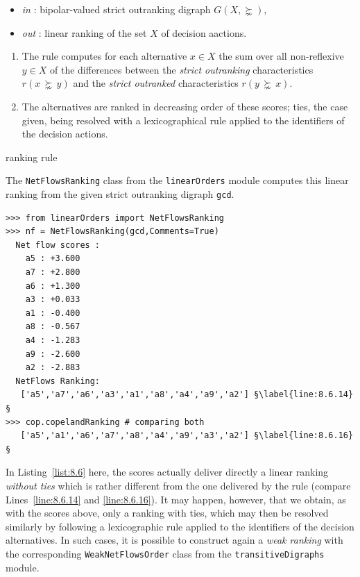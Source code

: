 \begin{algorithm}[H]
  {\normalsize
\begin{itemize}
 \item [] \emph{in} : bipolar-valued strict outranking digraph $G(X,\succnsim)$,
 \item [] \emph{out} : linear ranking of the set $X$ of decision aactions.
\end{itemize}
  \begin{enumerate}
  \item The \NetFlows rule computes for each alternative $x \in X$ the sum over all non-reflexive $y \in X$ of the differences between the \emph{strict outranking} characteristics $r(x\, \succnsim \,y)$ and the \emph{strict outranked} characteristics $r(y\, \succnsim \,x)$.
  \item  The alternatives are ranked in decreasing order of these \NetFlows scores; ties, the case given, being resolved with a lexicographical rule applied to the identifiers of the decision actions.
  \end{enumerate}
}
\caption{\NetFlows ranking rule}
\label{alg:8.2}
\end{algorithm}

The \texttt{NetFlowsRanking} class from the \texttt{linearOrders} module computes this linear ranking from the given strict outranking digraph \texttt{gcd}.
\begin{lstlisting}[caption={Computing a \NetFlows ranking},label=list:8.6]
>>> from linearOrders import NetFlowsRanking
>>> nf = NetFlowsRanking(gcd,Comments=True)
  Net flow scores :
    a5 : +3.600
    a7 : +2.800
    a6 : +1.300
    a3 : +0.033
    a1 : -0.400
    a8 : -0.567
    a4 : -1.283
    a9 : -2.600
    a2 : -2.883
  NetFlows Ranking:
   ['a5','a7','a6','a3','a1','a8','a4','a9','a2'] §\label{line:8.6.14}§
>>> cop.copelandRanking # comparing both
   ['a5','a1','a6','a7','a8','a4','a9','a3','a2'] §\label{line:8.6.16}§
\end{lstlisting}

In Listing~\vref{list:8.6} here, the \NetFlows scores actually deliver directly a linear ranking \emph{without ties} which is rather different from the one delivered by the \Copeland rule (compare Lines~\ref{line:8.6.14} and \ref{line:8.6.16}). It may happen, however, that we obtain, as with the \Copeland scores above, only a ranking with ties, which may then be resolved similarly by following a lexicographic rule applied to the identifiers of the decision alternatives. In such cases, it is possible to construct again a \emph{weak ranking} with the corresponding \texttt{WeakNetFlowsOrder} class from the \texttt{transitiveDigraphs} module.


